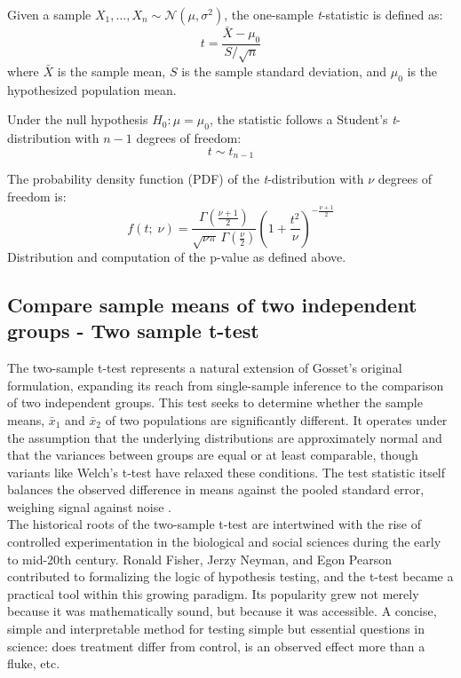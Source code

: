 \documentclass{book}
\begin{document}
Given a sample \( X_1, \ldots, X_n \sim \mathcal{N}(\mu, \sigma^2) \), the one-sample \textit{t}-statistic is defined as:
\[
t = \frac{\bar{X} - \mu_0}{S / \sqrt{n}}
\]
where \( \bar{X} \) is the sample mean, \( S \) is the sample standard deviation, and \( \mu_0 \) is the hypothesized population mean.

Under the null hypothesis \( H_0: \mu = \mu_0 \), the statistic follows a Student's \textit{t}-distribution with \( n-1 \) degrees of freedom:
\[
t \sim t_{n-1}
\]

The probability density function (PDF) of the \textit{t}-distribution with \( \nu \) degrees of freedom is:
\begin{equation}
	f(t; \; \nu) = \frac{\Gamma\left(\frac{\nu+1}{2}\right)}{\sqrt{\nu \pi} \, \Gamma\left(\frac{\nu}{2}\right)} \left(1 + \frac{t^2}{\nu}\right)^{-\frac{\nu+1}{2}}
\end{equation}
Distribution and computation of the p-value as defined above.

\newpage

\subsection{Compare sample means of two independent groups - Two sample t-test}

The two-sample t-test represents a natural extension of Gosset's original formulation, expanding its reach from single-sample inference to the comparison of two independent groups. This test seeks to determine whether the sample means, $\bar{x}_1$ and $\bar{x}_2$ of two populations are significantly different. It operates under the assumption that the underlying distributions are approximately normal and that the variances between groups are equal or at least comparable, though variants like Welch’s t-test have relaxed these conditions. The test statistic itself balances the observed difference in means against the pooled standard error, weighing signal against noise \cite{welch1947}.\\

The historical roots of the two-sample t-test are intertwined with the rise of controlled experimentation in the biological and social sciences during the early to mid-20th century. Ronald Fisher, Jerzy Neyman, and Egon Pearson contributed to formalizing the logic of hypothesis testing, and the t-test became a practical tool within this growing paradigm. Its popularity grew not merely because it was mathematically sound, but because it was accessible. A concise, simple and interpretable method for testing simple but essential questions in science: does treatment differ from control, is an observed effect more than a fluke, etc.\\
\end{document}
